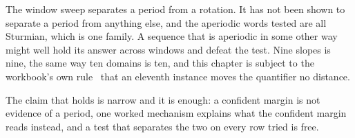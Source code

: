 The window sweep separates a period from a rotation. It has not been shown to separate a period from
anything else, and the aperiodic words tested are all Sturmian, which is one family. A sequence that
is aperiodic in some other way might well hold its answer across windows and defeat the test. Nine
slopes is nine, the same way ten domains is ten, and this chapter is subject to the workbook's own
rule~\cite{src:Quigg-orior-workbook} that an eleventh instance moves the quantifier no distance.

The claim that holds is narrow and it is enough: a confident margin is not evidence of a period, one
worked mechanism explains what the confident margin reads instead, and a test that separates
the two on every row tried is free.
